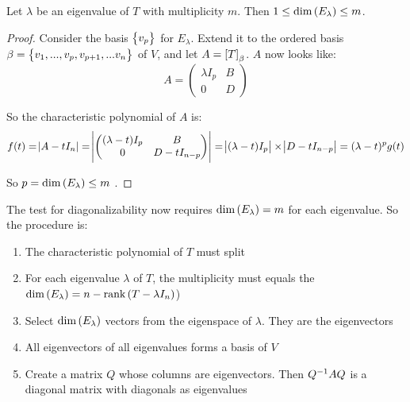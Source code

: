 \begin{theorem}
    Let $\lambda$ be an eigenvalue of $T$ with multiplicity $m$. Then $1 \leq \displaystyle \text{dim}\left( E_\lambda \right) \leq m$.
\end{theorem}
\begin{proof}
    Consider the basis $\set{v_p}$ for $E_\lambda$. Extend it to the ordered basis $\beta = \set{v_1, ..., v_p, v_{p+1}, ... v_n}$ of $V$, and let $A = \coordinate{T}_\beta$. $A$ now looks like:
    \begin{equation*}
        A = \begin{pmatrix}
            \lambda I_p & B \\
            0 & D
        \end{pmatrix}
    \end{equation*}
    
    So the characteristic polynomial of $A$ is:
    \begin{equation*}
        \begin{aligned}
            f(t) = \abs{A - t I_n}  = \abs{\begin{pmatrix}
                (\lambda - t) I_p & B \\
                0 & D - t I_{n-p}
            \end{pmatrix}} = \abs{(\lambda - t) I_p} \times \abs{D - t I_{n-p}}  = (\lambda - t)^p g(t)
        \end{aligned}
    \end{equation*}
    
    So $p= \displaystyle \text{dim}\left( E_\lambda \right) \leq m$ .
\end{proof}

The test for diagonalizability now requires $\displaystyle \text{dim}\left( E_\lambda \right) = m$ for each eigenvalue. So the procedure is:
\begin{enumerate}
    \item The characteristic polynomial of $T$ must split
    \item For each eigenvalue $\lambda$ of $T$, the multiplicity must equals the $\displaystyle \text{dim}\left( E_\lambda \right) = n - \displaystyle \text{rank}\left( T - \lambda I_n \right)$)
    \item Select $\displaystyle \text{dim}\left( E_\lambda \right)$ vectors from the eigenspace of $\lambda$. They are the eigenvectors
    \item All eigenvectors of all eigenvalues forms a basis of $V$
    \item Create a matrix $Q$ whose columns are eigenvectors. Then ${Q}^{-1} A Q$ is a diagonal matrix with diagonals as eigenvalues
\end{enumerate}

